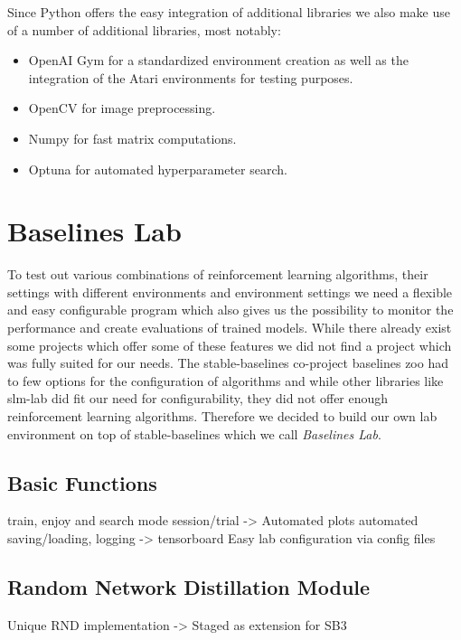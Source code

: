 Since Python offers the easy integration of additional libraries we also make use of a number of additional libraries, most notably:
\begin{itemize}
    \item OpenAI Gym \cite{openAIgym} for a standardized environment creation as well as the integration of the Atari environments for testing purposes.
    \item OpenCV \cite{opencv_library} for image preprocessing.
    \item Numpy \cite{oliphant2006guide} for fast matrix computations.
    \item Optuna \cite{akiba2019optuna} for automated hyperparameter search.
\end{itemize}

\section{Baselines Lab} \label{sec:BaselinesLab}
To test out various combinations of reinforcement learning algorithms, their settings with different environments and environment settings we need a flexible and easy configurable program which also gives us the possibility to monitor the performance and create evaluations of trained models. While there already exist some projects which offer some of these features we did not find a project which was fully suited for our needs. The stable-baselines co-project baselines zoo \cite{rl-zoo} had to few options for the configuration of algorithms and while other libraries like slm-lab \cite{kenggraesser2017slmlab} did fit our need for configurability, they did not offer enough reinforcement learning algorithms. Therefore we decided to build our own lab environment on top of stable-baselines which we call \textit{Baselines Lab}.

\subsection{Basic Functions} \label{sec:blFunctions}
train, enjoy and search mode
session/trial -> Automated plots
automated saving/loading, logging -> tensorboard
Easy lab configuration via config files

\subsection{Random Network Distillation Module} \label{sec:blRND}
Unique RND implementation -> Staged as extension for SB3

